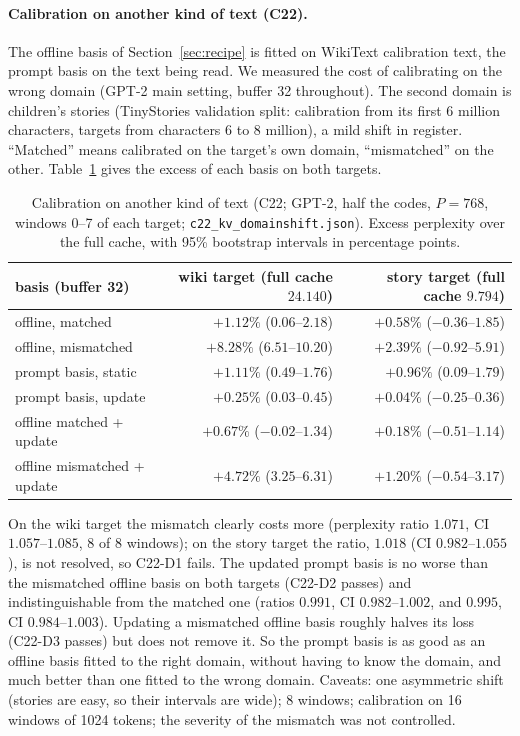 \documentclass[10pt]{article}
\theoremstyle{plain}
\theoremstyle{definition}
\theoremstyle{remark}
\newcommand{\rl}[1]{\textsf{#1}}%
\begin{document}
\paragraph{Calibration on another kind of text (C22).} The offline basis of Section~\ref{sec:recipe} is fitted on WikiText calibration text, the prompt basis on the text being read. We measured the cost of calibrating on the wrong domain (GPT-2 main setting, buffer 32 throughout). The second domain is children's stories (TinyStories validation split: calibration from its first 6 million characters, targets from characters 6 to 8 million), a mild shift in register. ``Matched'' means calibrated on the target's own domain, ``mismatched'' on the other. Table~\ref{tab:c22} gives the excess of each basis on both targets.

\begin{table}[!htb]
\centering\small
\begin{tabular*}{\textwidth}{@{\extracolsep{\fill}}lrr@{}}
\toprule
basis (buffer 32) & wiki target (full cache $24.140$) & story target (full cache $9.794$)\\
\midrule
offline, matched & $+1.12\%$ ($0.06$--$2.18$) & $+0.58\%$ ($-0.36$--$1.85$)\\
offline, mismatched & $+8.28\%$ ($6.51$--$10.20$) & $+2.39\%$ ($-0.92$--$5.91$)\\
prompt basis, static & $+1.11\%$ ($0.49$--$1.76$) & $+0.96\%$ ($0.09$--$1.79$)\\
prompt basis, update & $+0.25\%$ ($0.03$--$0.45$) & $+0.04\%$ ($-0.25$--$0.36$)\\
offline matched + update & $+0.67\%$ ($-0.02$--$1.34$) & $+0.18\%$ ($-0.51$--$1.14$)\\
offline mismatched + update & $+4.72\%$ ($3.25$--$6.31$) & $+1.20\%$ ($-0.54$--$3.17$)\\
\bottomrule
\end{tabular*}
\caption{Calibration on another kind of text (C22; GPT-2, half the codes, $P=768$, windows 0--7 of each target; \texttt{c22\_kv\_domainshift.json}). Excess perplexity over the full cache, with 95\% bootstrap intervals in percentage points.}
\label{tab:c22}
\end{table}

On the wiki target the mismatch clearly costs more (perplexity ratio $1.071$, CI $1.057$--$1.085$, 8 of 8 windows); on the story target the ratio, $1.018$ (CI $0.982$--$1.055$), is not resolved, so \rl{C22-D1} fails. The updated prompt basis is no worse than the mismatched offline basis on both targets (\rl{C22-D2} passes) and indistinguishable from the matched one (ratios $0.991$, CI $0.982$--$1.002$, and $0.995$, CI $0.984$--$1.003$). Updating a mismatched offline basis roughly halves its loss (\rl{C22-D3} passes) but does not remove it. So the prompt basis is as good as an offline basis fitted to the right domain, without having to know the domain, and much better than one fitted to the wrong domain. Caveats: one asymmetric shift (stories are easy, so their intervals are wide); 8 windows; calibration on 16 windows of 1024 tokens; the severity of the mismatch was not controlled.
\end{document}
